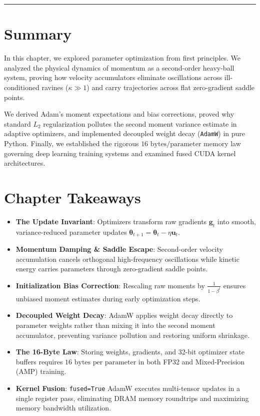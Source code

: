 \documentclass[
  letterpaper,
]{scrbook}
\providecommand{\tightlist}{%
  \setlength{\itemsep}{0pt}\setlength{\parskip}{0pt}}
\begin{document}
\begin{center}\rule{0.5\linewidth}{0.5pt}\end{center}

\section{Summary}\label{summary-7}

In this chapter, we explored parameter optimization from first
principles. We analyzed the physical dynamics of momentum as a
second-order heavy-ball system, proving how velocity accumulators
eliminate oscillations across ill-conditioned ravines (\(\kappa \gg 1\))
and carry trajectories across flat zero-gradient saddle points.

We derived Adam's moment expectations and bias corrections, proved why
standard \(L_2\) regularization pollutes the second moment variance
estimate in adaptive optimizers, and implemented decoupled weight decay
(\texttt{AdamW}) in pure Python. Finally, we established the rigorous
\(16\text{ bytes/parameter}\) memory law governing deep learning
training systems and examined fused CUDA kernel architectures.

\section{Chapter Takeaways}\label{chapter-takeaways-7}

\begin{itemize}
\tightlist
\item
  \textbf{The Update Invariant}: Optimizers transform raw gradients
  \(\mathbf{g}_t\) into smooth, variance-reduced parameter updates
  \(\mathbf{\theta}_{t+1} = \mathbf{\theta}_t - \eta \mathbf{u}_t\).
\item
  \textbf{Momentum Damping \& Saddle Escape}: Second-order velocity
  accumulation cancels orthogonal high-frequency oscillations while
  kinetic energy carries parameters through zero-gradient saddle points.
\item
  \textbf{Initialization Bias Correction}: Rescaling raw moments by
  \(\frac{1}{1 - \beta^t}\) ensures unbiased moment estimates during
  early optimization steps.
\item
  \textbf{Decoupled Weight Decay}: AdamW applies weight decay directly
  to parameter weights rather than mixing it into the second moment
  accumulator, preventing variance pollution and restoring uniform
  shrinkage.
\item
  \textbf{The 16-Byte Law}: Storing weights, gradients, and 32-bit
  optimizer state buffers requires \(16\text{ bytes per parameter}\) in
  both FP32 and Mixed-Precision (AMP) training.
\item
  \textbf{Kernel Fusion}: \texttt{fused=True} AdamW executes
  multi-tensor updates in a single register pass, eliminating DRAM
  memory roundtrips and maximizing memory bandwidth utilization.
\end{itemize}
\end{document}
